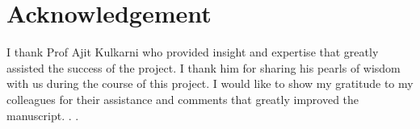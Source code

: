 %
\chapter*{Acknowledgement}
\label{sec:acknowledgement}
\vspace{10mm}
{\large
I thank Prof Ajit Kulkarni who provided insight and expertise that greatly assisted the success of the project.  I thank him for sharing his pearls of wisdom with us during the course of this project. I would like to show my gratitude to  my colleagues for their assistance and comments that greatly improved  the  manuscript.  . . }



